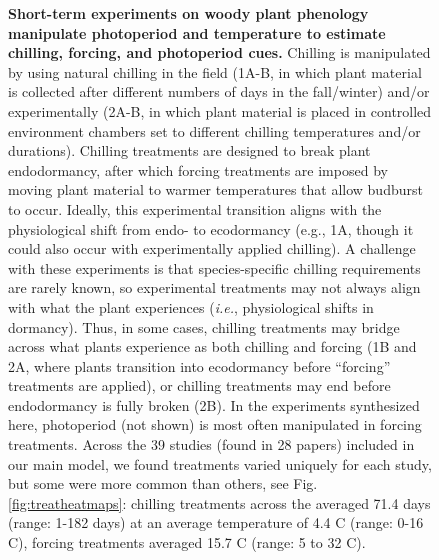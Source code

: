 \documentclass{article}
\begin{document}
\begin{figure}[h!]
\caption{\textbf{Short-term experiments on woody plant phenology manipulate photoperiod and temperature to estimate chilling, forcing, and photoperiod cues.} Chilling is manipulated by using natural chilling in the field (1A-B, in which plant material is collected after different numbers of days in the fall/winter) and/or experimentally (2A-B, in which plant material is placed in controlled environment chambers set to different chilling temperatures and/or durations). Chilling treatments are designed to break plant endodormancy, after which forcing treatments are imposed by moving plant material to warmer temperatures that allow budburst to occur. Ideally, this experimental transition aligns with the physiological shift from endo- to ecodormancy (e.g., 1A, though it could also occur with experimentally applied chilling). A challenge with these experiments is that species-specific chilling requirements are rarely known, so experimental treatments may not always align with what the plant experiences (\emph{i.e.}, physiological shifts in dormancy). Thus, in some cases, chilling treatments may bridge across what plants experience as both chilling and forcing (1B and 2A, where plants transition into ecodormancy before ``forcing'' treatments are applied), or chilling treatments may end before endodormancy is fully broken (2B). In the experiments synthesized here, photoperiod (not shown) is most often manipulated in forcing treatments. Across the 39 studies (found in 28 papers) included in our main model, we found treatments varied uniquely for each study, but some were more common than others, see Fig. \ref{fig:treatheatmaps}: chilling treatments across the averaged 71.4 days (range: 1-182 days) at an average temperature of 4.4 \degree C (range: 0-16 \degree C), forcing treatments averaged 15.7 \degree C (range: 5 to 32 \degree C).}
\label{fig:concept} 
\end{figure}
\end{document}
